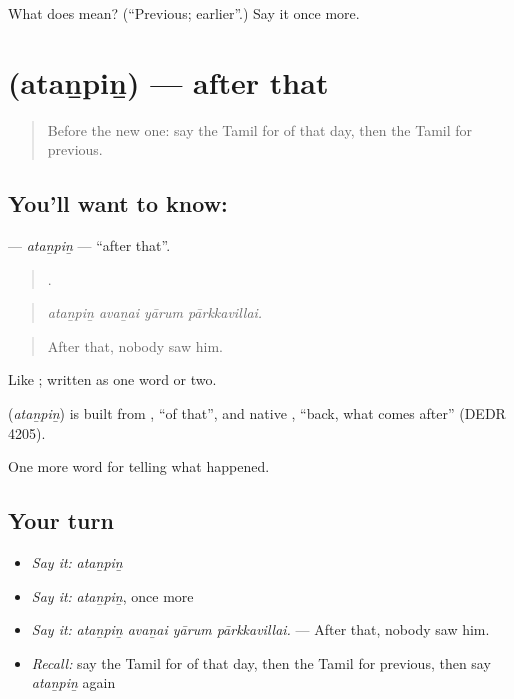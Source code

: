 \begin{tcolorbox}[breakable,colback=teal!4,colframe=teal!35!black,title={Before you move on}]
What does  mean? (\textquotedblleft{}Previous; earlier\textquotedblright{}.) Say it once more.
\end{tcolorbox}
\section[\texorpdfstring{\ta{அதன்பின்} (ataṉpiṉ)}{அதன்பின் (ataṉpiṉ)}]{ (ataṉpiṉ) — after that}

\label{lesson:TA-C316-atanpin}



\begin{quote}
Before the new one: say the Tamil for of that day, then the Tamil for previous.
\end{quote}

\subsection*{You'll want to know: }
\textbf{} — \emph{ataṉpiṉ} — \textquotedblleft{}after that\textquotedblright{}.

\begin{quote}
   .
\end{quote}

\begin{quote}
\emph{ataṉpiṉ avaṉai yārum pārkkavillai.}
\end{quote}

\begin{quote}
After that, nobody saw him.
\end{quote}

Like  ; written as one word or two.

\begin{cousinweb}
\textbf{} (\emph{ataṉpiṉ}) is built from , \textquotedblleft{}of that\textquotedblright{}, and native , \textquotedblleft{}back, what comes after\textquotedblright{} (DEDR 4205).
\end{cousinweb}

\begin{grammarlens}[title={What you've built}]
One more word for telling what happened.
\end{grammarlens}

\subsection*{Your turn}
\begin{itemize}
\raggedright
  \item \emph{Say it:} \emph{ataṉpiṉ}
  \item \emph{Say it:} \emph{ataṉpiṉ}, once more
  \item \emph{Say it:} \emph{ataṉpiṉ avaṉai yārum pārkkavillai.} — After that, nobody saw him.
  \item \emph{Recall:} say the Tamil for of that day, then the Tamil for previous, then say \emph{ataṉpiṉ} again
\end{itemize}

